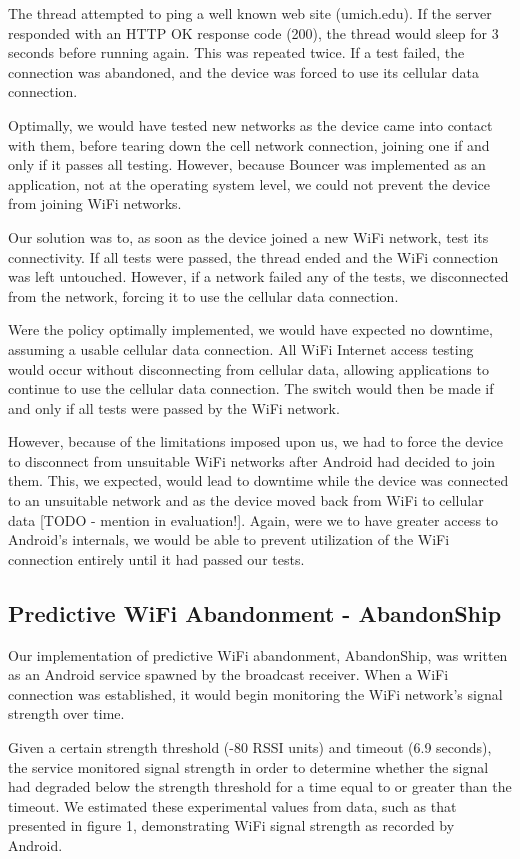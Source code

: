 The thread attempted to ping a well known web site (umich.edu). If the server responded with an HTTP OK response code (200), the thread would sleep for 3 seconds before running again. This was repeated twice. If a test failed, the connection was abandoned, and the device was forced to use its cellular data connection.

Optimally, we would have tested new networks as the device came into contact with them, before tearing down the cell network connection, joining one if and only if it passes all testing. However, because Bouncer was implemented as an application, not at the operating system level, we could not prevent the device from joining WiFi networks.

Our solution was to, as soon as the device joined a new WiFi network, test its connectivity. If all tests were passed, the thread ended and the WiFi connection was left untouched. However, if a network failed any of the tests, we disconnected from the network, forcing it to use the cellular data connection.

Were the policy optimally implemented, we would have expected no downtime, assuming a usable cellular data connection. All WiFi Internet access testing would occur without disconnecting from cellular data, allowing applications to continue to use the cellular data connection. The switch would then be made if and only if all tests were passed by the WiFi network.

However, because of the limitations imposed upon us, we had to force the device to disconnect from unsuitable WiFi networks after Android had decided to join them. This, we expected, would lead to downtime while the device was connected to an unsuitable network and as the device moved back from WiFi to cellular data [TODO - mention in evaluation!]. Again, were we to have greater access to Android's internals, we would be able to prevent utilization of the WiFi connection entirely until it had passed our tests.

\subsection{Predictive WiFi Abandonment - AbandonShip}
Our implementation of predictive WiFi abandonment, AbandonShip, was written as an Android service spawned by the broadcast receiver. When a WiFi connection was established, it would begin monitoring the WiFi network's signal strength over time.

Given a certain strength threshold (-80 RSSI units) and timeout (6.9 seconds), the service monitored signal strength in order to determine whether the signal had degraded below the strength threshold for a time equal to or greater than the timeout. We estimated these experimental values from data, such as that presented in figure 1, demonstrating WiFi signal strength as recorded by Android. 

